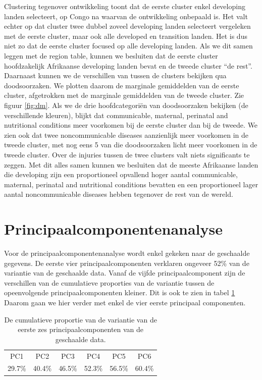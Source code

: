 \documentclass[a4paper,kulak]{kulakarticle}
\begin{document}
Clustering tegenover ontwikkeling toont dat de eerste cluster enkel developing landen selecteert, op Congo na waarvan de ontwikkeling onbepaald is.
Het valt echter op dat cluster twee dubbel zoveel developing landen selecteert vergeleken met de eerste cluster, maar ook alle developed en transition landen.
Het is dus niet zo dat de eerste cluster focused op alle developing landen.
Als we dit samen leggen met de region table, kunnen we besluiten dat de eerste cluster hoofdzakelijk Afrikaanse developing landen bevat en de tweede cluster ``de rest''. \newline
Daarnaast kunnen we de verschillen van tussen de clusters bekijken qua doodsoorzaken.
We plotten daarom de marginale gemiddelden van de eerste cluster, afgetrokken met de marginale gemiddelden van de tweede cluster.
Zie figuur \ref{fig:dm}.
Als we de drie hoofdcategoriën van doodsoorzaken bekijken (de verschillende kleuren), blijkt dat communicable, maternal, perinatal and nutritional conditions meer voorkomen bij de eerste cluster dan bij de tweede.
We zien ook dat twee noncommunicable diseases aanzienlijk meer voorkomen in de tweede cluster, met nog eens 5 van die doodsoorzaken licht meer voorkomen in de tweede cluster.
Over de injuries tussen de twee clusters valt niets significants te zeggen. \newline
Met dit alles samen kunnen we besluiten dat de meeste Afrikaanse landen die developing zijn een proportioneel opvallend hoger aantal  communicable, maternal, perinatal and nutritional conditions bevatten en een proportioneel lager aantal noncommunicable diseases hebben tegenover de rest van de wereld.



\section{Principaalcomponentenanalyse}

Voor de principaalcomponentenanalyse wordt enkel gekeken naar de geschaalde gegevens. De eerste vier principaalcomponenten verklaren ongeveer 52\% van de variantie van de geschaalde data. Vanaf de vijfde principaalcomponent zijn de verschillen van de cumulatieve proporties van de variantie tussen de opeenvolgende principaalcomponenten kleiner. Dit is ook te zien in tabel \ref{table:pca} Daarom gaan we hier verder met enkel de vier eerste principaal componenten.

\begin{table}[ht]
	\centering
	\begin{tabular}{cccccc}
		\hline 
		PC1 & PC2 & PC3 & PC4 & PC5 & PC6 \\ 
		29.7\% & 40.4\% & 46.5\% & 52.3\% & 56.5\% & 60.4\%\\ 
		\hline 
	\end{tabular} 
	\caption{De cumulatieve proportie van de variantie van de eerste zes principaalcomponenten van de geschaalde data.}
	\label{table:pca}
\end{table}
\end{document}
